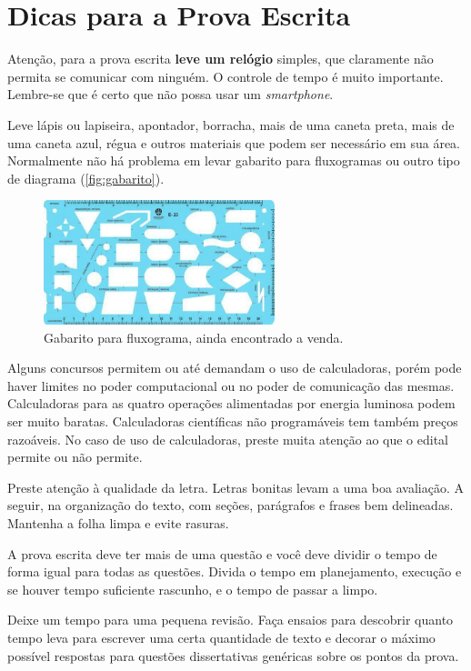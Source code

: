 \documentclass{article}
\begin{document}
\section{Dicas para a Prova Escrita}

Atenção, para a prova escrita \textbf{leve um relógio} simples, que claramente não permita se comunicar com ninguém. O controle de tempo é muito importante. Lembre-se que é certo que  não possa usar um \textit{smartphone}.

Leve lápis ou lapiseira, apontador, borracha, mais de uma caneta preta, mais de uma caneta azul, régua e outros materiais que podem ser necessário em sua área. Normalmente não há problema em levar gabarito para fluxogramas ou outro tipo de diagrama (\autoref{fig:gabarito}).

\begin{figure}
    \centering
    \includegraphics[width=0.6\textwidth]{gabaritofluxograma.png}
    \caption{Gabarito para fluxograma, ainda encontrado a venda.}
    \label{fig:gabarito}
\end{figure}


Alguns concursos permitem ou até demandam o uso de calculadoras, porém pode haver limites no poder computacional ou no poder de comunicação das mesmas. Calculadoras para as quatro operações alimentadas por energia luminosa podem ser muito baratas. Calculadoras científicas não programáveis tem também preços razoáveis. No caso de uso de calculadoras, preste muita atenção ao que o edital permite ou não permite.

Preste atenção à qualidade da letra. Letras bonitas levam a uma boa avaliação. A seguir, na organização do texto, com seções, parágrafos e frases bem delineadas. Mantenha a folha limpa e evite rasuras.

A prova escrita deve ter mais de uma questão e você deve dividir o tempo de forma igual para todas as questões.
Divida o tempo em planejamento, execução e se houver tempo suficiente rascunho, e o tempo de passar a limpo.

Deixe um tempo para uma pequena revisão. Faça ensaios para descobrir quanto tempo leva para escrever uma certa quantidade de texto e decorar o máximo possível respostas para questões dissertativas genéricas sobre os pontos da prova.
\end{document}
